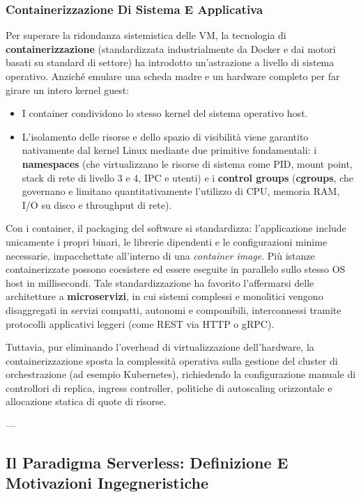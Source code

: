 \documentclass[11pt, a4paper]{article}
\begin{document}
\subsubsection{Containerizzazione Di Sistema E Applicativa}
\label{subsubsec:containerization_review}
Per superare la ridondanza sistemistica delle VM, la tecnologia di \textbf{containerizzazione} (standardizzata industrialmente da Docker e dai motori basati su standard di settore) ha introdotto un'astrazione a livello di sistema operativo. Anziché emulare una scheda madre e un hardware completo per far girare un intero kernel guest:
\begin{itemize}[noitemsep]
    \item I container condividono lo stesso kernel del sistema operativo host.
    \item L'isolamento delle risorse e dello spazio di visibilità viene garantito nativamente dal kernel Linux mediante due primitive fondamentali: i \textbf{namespaces} (che virtualizzano le risorse di sistema come PID, mount point, stack di rete di livello 3 e 4, IPC e utenti) e i \textbf{control groups} (\textbf{cgroups}, che governano e limitano quantitativamente l'utilizzo di CPU, memoria RAM, I/O su disco e throughput di rete).
\end{itemize}
Con i container, il packaging del software si standardizza: l'applicazione include unicamente i propri binari, le librerie dipendenti e le configurazioni minime necessarie, impacchettate all'interno di una \emph{container image}. Più istanze containerizzate possono coesistere ed essere eseguite in parallelo sullo stesso OS host in millisecondi. Tale standardizzazione ha favorito l'affermarsi delle architetture a \textbf{microservizi}, in cui sistemi complessi e monolitici vengono disaggregati in servizi compatti, autonomi e componibili, interconnessi tramite protocolli applicativi leggeri (come REST via HTTP o gRPC).

Tuttavia, pur eliminando l'overhead di virtualizzazione dell'hardware, la containerizzazione sposta la complessità operativa sulla gestione del cluster di orchestrazione (ad esempio Kubernetes), richiedendo la configurazione manuale di controllori di replica, ingress controller, politiche di autoscaling orizzontale e allocazione statica di quote di risorse.

---

\subsection{Il Paradigma Serverless: Definizione E Motivazioni Ingegneristiche}
\end{document}
